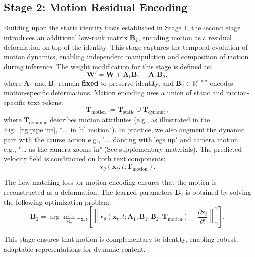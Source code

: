 \subsection{Stage 2: Motion Residual Encoding}

Building upon the static identity basis established in Stage 1, the second stage introduces an additional low-rank matrix $\mathbf{B}_2$, encoding motion as a residual deformation on top of the identity. This stage captures the temporal evolution of motion dynamics, enabling independent manipulation and composition of motion during inference. The weight modification for this stage is defined as:
\begin{equation}
\mathbf{W}' = \mathbf{W} + \mathbf{A}_1 \mathbf{B}_1 + \mathbf{A}_1 \mathbf{B}_2,
\end{equation}
where $\mathbf{A}_1$ and $\mathbf{B}_1$ remain \textbf{fixed} to preserve identity, and $\mathbf{B}_2 \in \mathbb{R}^{r \times n}$ encodes motion-specific deformations. Motion encoding uses a union of static and motion-specific text tokens:
\begin{equation}
\mathbf{T}_{\text{motion}} := \mathbf{T}_{\text{static}} \cup \mathbf{T}_{\text{dynamic}},
\end{equation}
where $\mathbf{T}_{\text{dynamic}}$ describes motion attributes (e.g., as illustrated in the Fig.~\ref{fig:pipeline}, "... in [u] motion"). In practice, we also augment the dynamic part with the course action e.g., "... dancing with legs up" and camera motion e.g., "... as the camera zooms in" (See supplementary materials). The predicted velocity field is conditioned on both text components:
\begin{equation}
\mathbf{v}_\theta (\mathbf{x}_t, t; \mathbf{T}_{\text{motion}}).
\end{equation}

The flow matching loss for motion encoding ensures that the motion is reconstructed as a deformation. The learned parameters \(\mathbf{B}_2\) is obtained by solving the following optimization problem:
\begin{equation}
\mathbf{B}_2 = \arg \min_{\mathbf{B}_2} \mathbb{E}_{\mathbf{x}, t} \left[ \left\| \mathbf{v}_\theta (\mathbf{x}_t, t; \mathbf{A}_1, \mathbf{B}_1, \mathbf{B}_2, \mathbf{T}_{\text{motion}}) - \frac{\partial \mathbf{x}_t}{\partial t} \right\|_2^2 \right].
\end{equation}

This stage ensures that motion is complementary to identity, enabling robust, adaptable representations for dynamic content.


